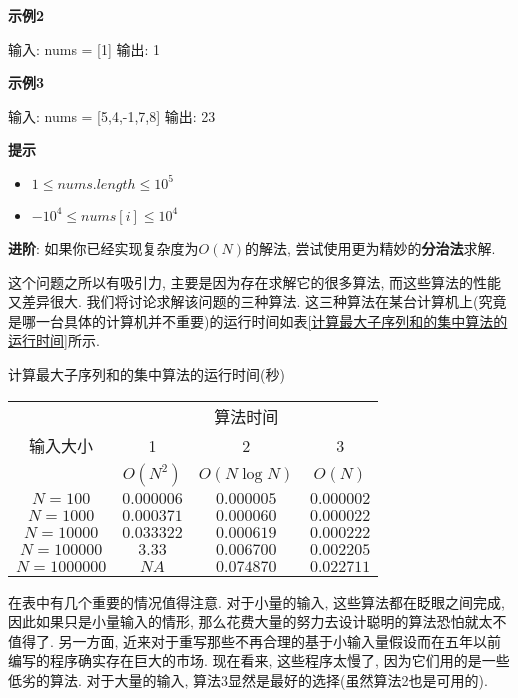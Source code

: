 \documentclass[oneside]{ctexbook}
\begin{document}
{\textbf{示例2}

\begin{mytext}
输入: nums = [1]
输出: 1
\end{mytext}

\textbf{示例3}

\begin{mytext}
输入: nums = [5,4,-1,7,8]
输出: 23
\end{mytext}

\textbf{提示}

\begin{itemize}
    \item $1 \leq nums.length \leq 10^5$
    \item $-10^4 \leq nums[i] \leq 10^4$
\end{itemize}

\textbf{进阶}: 如果你已经实现复杂度为$O(N)$的解法, 尝试使用更为精妙的\textbf{分治法}求解.

这个问题之所以有吸引力, 主要是因为存在求解它的很多算法, 而这些算法的性能又差异很大. 我们将讨论求解该问题的三种算法. 这三种算法在某台计算机上(究竟是哪一台具体的计算机并不重要)的运行时间如表\ref{计算最大子序列和的集中算法的运行时间}所示.

\begin{mytable}[float=t, label=计算最大子序列和的集中算法的运行时间]{计算最大子序列和的集中算法的运行时间(秒)}
    \begin{tabular}{|c|c|c|c|}
    \hline
    \multirow{3}{*}{输入大小} & \multicolumn{3}{|c|}{算法时间} \\ \cline{2-4}
    & 1        & 2             & 3   \\
    & $O(N^2)$ & $O(N\log{N})$ & $O(N)$ \\
    \hline
    $N=100$     & $0.000006$ & $0.000005$ & $0.000002$ \\
    $N=1000$    & $0.000371$ & $0.000060$ & $0.000022$ \\
    $N=10000$   & $0.033322$ & $0.000619$ & $0.000222$ \\
    $N=100000$  & $3.33$     & $0.006700$ & $0.002205$ \\
    $N=1000000$ & $NA$       & $0.074870$ & $0.022711$ \\
    \hline
    \end{tabular}
\end{mytable}

在表中有几个重要的情况值得注意. 对于小量的输入, 这些算法都在眨眼之间完成, 因此如果只是小量输入的情形, 那么花费大量的努力去设计聪明的算法恐怕就太不值得了. 另一方面, 近来对于重写那些不再合理的基于小输入量假设而在五年以前编写的程序确实存在巨大的市场. 现在看来, 这些程序太慢了, 因为它们用的是一些低劣的算法. 对于大量的输入, 算法3显然是最好的选择(虽然算法2也是可用的).

}
\end{document}
